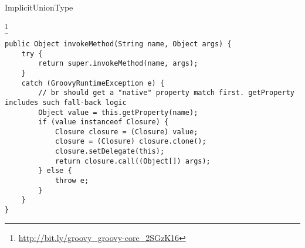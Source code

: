 \begin{pattern}{ImplicitUnionType}

\instances{}

\footnote{\url{http://bit.ly/groovy_groovy-core_2SGzK16}}


\begin{verbatim}
public Object invokeMethod(String name, Object args) {
    try {
        return super.invokeMethod(name, args);
    }
    catch (GroovyRuntimeException e) {
        // br should get a "native" property match first. getProperty includes such fall-back logic
        Object value = this.getProperty(name);
        if (value instanceof Closure) {
            Closure closure = (Closure) value;
            closure = (Closure) closure.clone();
            closure.setDelegate(this);
            return closure.call((Object[]) args);
        } else {
            throw e;
        }
    }
}
\end{verbatim}

\detection{}

\discussion{}

\related{}

\end{pattern}